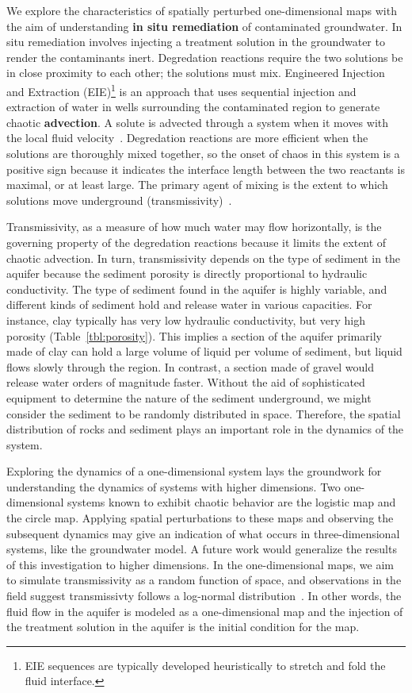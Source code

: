We explore the characteristics of spatially perturbed one-dimensional
maps with the aim of understanding \textbf{in situ remediation} of contaminated
groundwater. In situ remediation involves injecting a treatment
solution in the groundwater to render the contaminants
inert. Degredation reactions require the two solutions be in close proximity to each other; the solutions must mix. Engineered Injection and Extraction (EIE)\footnote{EIE sequences are typically developed
heuristically to stretch and fold the fluid interface.} is an
approach that uses sequential injection and extraction of water in wells surrounding
the contaminated region to generate chaotic \textbf{advection}. A
solute is advected through a system when it moves with the local fluid
velocity~\cite{advection}. Degredation reactions are more efficient when the solutions are thoroughly mixed
together, so the onset of chaos in this system is a positive sign
because it indicates the interface length between the two reactants is
maximal, or at least large. The primary agent of mixing is the extent to which
solutions move underground (transmissivity)~\cite{neupauer}. 

Transmissivity, as a measure of how
much water may flow horizontally, is the governing property of the
degredation reactions because it limits the extent of chaotic advection. In turn, transmissivity depends on the type of sediment in
the aquifer because the sediment porosity is directly proportional to
hydraulic conductivity. The type of sediment found in the aquifer is
highly variable, and different kinds of sediment hold and release water in various capacities. For instance, clay typically has
very low hydraulic conductivity, but very high porosity (Table~\ref{tbl:porosity}). This
implies a section of the aquifer primarily made of clay can hold a
large volume of liquid per volume of sediment, but liquid flows slowly
through the region. In contrast, a section made of gravel would
release water orders of magnitude faster. Without the aid of sophisticated equipment to
determine the nature of the sediment underground, we might consider
the sediment to be randomly distributed in space. Therefore, the
spatial distribution of rocks and sediment plays an important role in the dynamics of the system. 

Exploring the dynamics of a one-dimensional system lays the groundwork
for understanding the dynamics of systems with higher dimensions. Two
one-dimensional systems known to exhibit chaotic behavior are the
logistic map and the circle map. Applying spatial perturbations to
these maps and observing the subsequent dynamics may give an
indication of what occurs in three-dimensional systems, like the
groundwater model. A future work would generalize the results of
this investigation to higher dimensions. In the one-dimensional maps,
we aim to simulate transmissivity as a random function of space, and
observations in the field suggest transmissivty follows a log-normal
distribution~\cite{gelhar}. In other words, the fluid flow in the aquifer is modeled
as a one-dimensional map and the injection of the treatment solution
in the aquifer is the initial condition for the map.

